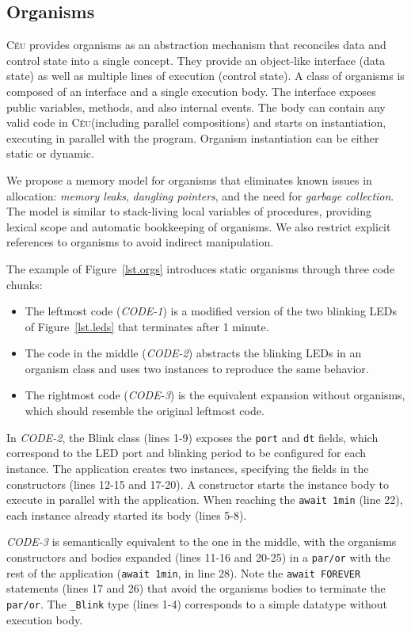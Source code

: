 \documentclass{acm_proc_article-sp}
\newcommand{\CEU}{\textsc{C\'{e}u}\xspace}
\newcommand{\code}[1] {{\small{\texttt{#1}}}}
\newcommand{\1}{\;}
\newcommand{\2}{\;\;}
\newcommand{\3}{\;\;\;}
\newcommand{\5}{\;\;\;\;\;}
\begin{document}
\subsection{Organisms}

\CEU provides organisms as an abstraction mechanism that reconciles data and 
control state into a single concept.
They provide an object-like interface (data state) as well as multiple lines of 
execution (control state).
%
A class of organisms is composed of an interface and a single execution body.  
The interface exposes public variables, methods, and also internal events.
The body can contain any valid code in \CEU (including parallel compositions) 
and starts on instantiation, executing in parallel with the program.
Organism instantiation can be either static or dynamic.

We propose a memory model for organisms that eliminates known issues in 
allocation: \emph{memory leaks}, \emph{dangling pointers}, and the need for 
\emph{garbage collection}.
%
The model is similar to stack-living local variables of procedures, providing 
lexical scope and automatic bookkeeping of organisms.
We also restrict explicit references to organisms to avoid indirect 
manipulation.

The example of Figure~\ref{lst.orgs} introduces static organisms through three 
code chunks:
%
\begin{itemize}
\item The leftmost code (\emph{CODE-1}) is a modified version of the two 
blinking LEDs of Figure~\ref{lst.leds} that terminates after 1 minute.
%
\item The code in the middle (\emph{CODE-2}) abstracts the blinking LEDs in an 
organism class and uses two instances to reproduce the same behavior.
%
\item The rightmost code (\emph{CODE-3}) is the equivalent expansion without 
organisms, which should resemble the original leftmost code.
\end{itemize}
%
In \emph{CODE-2}, the Blink class (lines 1-9) exposes the \code{port} and 
\code{dt} fields, which correspond to the LED port and blinking period to be 
configured for each instance.
The application creates two instances, specifying the fields in the 
constructors (lines 12-15 and 17-20).
A constructor starts the instance body to execute in parallel with the 
application.
When reaching the \code{await 1min} (line 22), each instance already started 
its body (lines 5-8).

\emph{CODE-3} is semantically equivalent to the one in the middle, with the 
organisms constructors and bodies expanded (lines 11-16 and 20-25) in a 
\code{par/or} with the rest of the application (\code{await 1min}, in line 28).  
Note the \code{await FOREVER} statements (lines 17 and 26) that avoid the 
organisms bodies to terminate the \code{par/or}.
The \code{\_Blink} type (lines 1-4) corresponds to a simple datatype without 
execution body.
\end{document}
